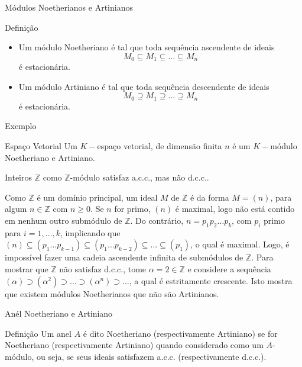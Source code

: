 \documentclass[aspectratio=169]{beamer}
\begin{document}
\begin{frame}{Módulos Noetherianos e Artinianos}
	\begin{block}{Definição}
		\begin{itemize}
			\item Um módulo Noetheriano é tal que toda sequência ascendente de ideais $$M_0 \subseteq M_1 \subseteq \ldots \subseteq M_n$$ é estacionária.
			      \pause
			\item Um módulo Artiniano é tal que toda sequência descendente de ideais $$M_0 \supseteq M_1 \supseteq \ldots \supseteq M_n$$ é estacionária.
		\end{itemize}
	\end{block}
\end{frame}

\begin{frame}{Exemplo}
	\begin{block}{Espaço Vetorial}
		Um $K-$espaço vetorial, de dimensão finita $n$ é um $K-$módulo Noetheriano e Artiniano.
	\end{block}
	\pause
	\begin{block}{Inteiros}
		$\mathbb{Z}$ como $\mathbb{Z}$-módulo satisfaz a.c.c., mas não d.c.c..

		Como $\mathbb{Z}$ é um domínio principal, um ideal $M$ de $\mathbb{Z}$ é da forma $M=(n)$, para algum $n \in \mathbb{Z}$ com $n \geq 0$. Se $n$ for primo, $(n)$ é maximal, logo não está contido em nenhum outro submódulo de $\mathbb{Z}$. Do contrário, $n=p_{1}p_{2}\dots p_{k}$, com $p_i$ primo para $i=1, \ldots, k$, implicando que $(n)\subseteq(p_{1}\dots p_{k-1})\subseteq(p_{1}\dots p_{k-2})\subseteq\dots \subseteq(p_{1})$, o qual é maximal. Logo, é impossível fazer uma cadeia ascendente infinita de submódulos de $\mathbb{Z}$.
		Para mostrar que $\mathbb{Z}$ não satisfaz d.c.c., tome $\alpha=2 \in \mathbb{Z}$ e considere a sequência $(\alpha)\supset(\alpha^{2})\supset\dots \supset(\alpha^{n})\supset\dots$, a qual é estritamente crescente. Isto mostra que existem módulos Noetherianos que não são Artinianos.
	\end{block}
\end{frame}

\begin{frame}{Anél Noetheriano e Artiniano}
	\begin{block}{Definição}
		Um anel $A$ é dito Noetheriano (respectivamente Artiniano) se for Noetheriano (respectivamente Artiniano) quando considerado como um $A$-módulo, ou seja, se seus ideais satisfazem a.c.c. (respectivamente d.c.c.).
	\end{block}
\end{frame}
\end{document}
